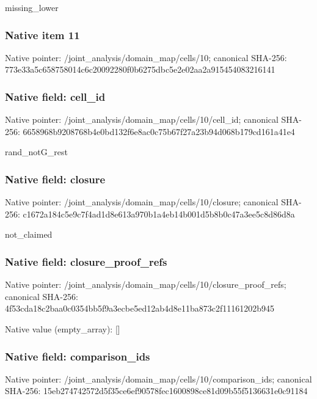 \documentclass[10pt,a4paper]{article}
\begin{document}
\begingroup\raggedright\sloppy missing\_\allowbreak{}lower\par\endgroup

\subsubsection{Native item 11}
Native pointer: /joint\_\allowbreak{}analysis/domain\_\allowbreak{}map/cells/10; canonical SHA-256: 773e33a5c658758014c6c20092280f0b6275dbc5e2e02aa2a915454083216141

\subsubsection{Native field: cell\_\allowbreak{}id}
Native pointer: /joint\_\allowbreak{}analysis/domain\_\allowbreak{}map/cells/10/cell\_\allowbreak{}id; canonical SHA-256: 6658968b9208768b4e0bd132f6e8ac0c75b67f27a23b94d068b179cd161a41e4

\begingroup\raggedright\sloppy rand\_\allowbreak{}notG\_\allowbreak{}rest\par\endgroup

\subsubsection{Native field: closure}
Native pointer: /joint\_\allowbreak{}analysis/domain\_\allowbreak{}map/cells/10/closure; canonical SHA-256: c1672a184c5e9c7f4ad1d8e613a970b1a4eb14b001d5b8b0c47a3ee5c8d86d8a

\begingroup\raggedright\sloppy not\_\allowbreak{}claimed\par\endgroup

\subsubsection{Native field: closure\_\allowbreak{}proof\_\allowbreak{}refs}
Native pointer: /joint\_\allowbreak{}analysis/domain\_\allowbreak{}map/cells/10/closure\_\allowbreak{}proof\_\allowbreak{}refs; canonical SHA-256: 4f53cda18c2baa0c0354bb5f9a3ecbe5ed12ab4d8e11ba873c2f11161202b945

Native value (empty\_\allowbreak{}array): []

\subsubsection{Native field: comparison\_\allowbreak{}ids}
Native pointer: /joint\_\allowbreak{}analysis/domain\_\allowbreak{}map/cells/10/comparison\_\allowbreak{}ids; canonical SHA-256: 15eb274742572d5f35ce6ef90578fec1600898ce81d09b55f5136631e0c91184
\end{document}
